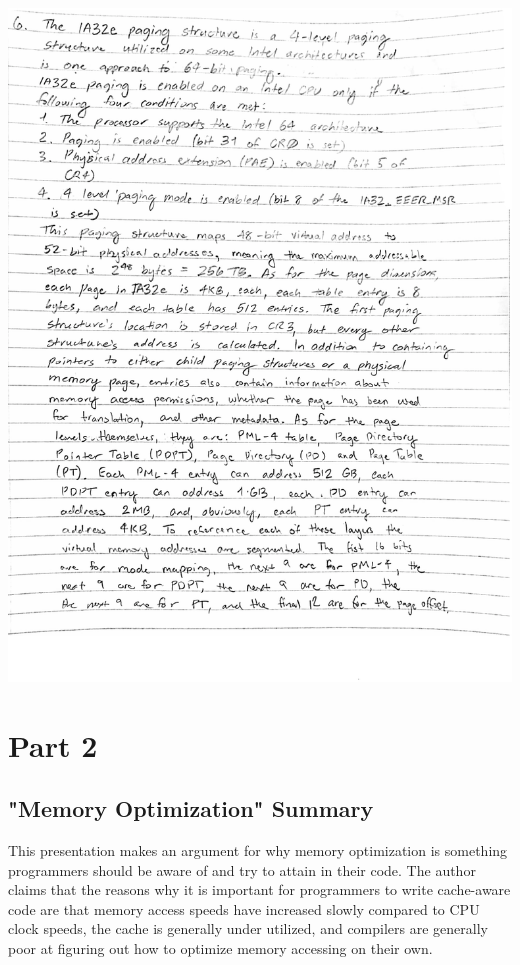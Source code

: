\documentclass[12pt]{article}
\begin{document}
\includegraphics[width=\textwidth]{part12.eps}
\clearpage
\section*{Part 2}
\subsection*{"Memory Optimization" Summary}
This presentation makes an argument for why memory optimization is something programmers should be aware of and try to attain in their code. The author claims that the reasons why it is important for programmers to write cache-aware code are that memory access speeds have increased slowly compared to CPU clock speeds, the cache is generally under utilized, and compilers are generally poor at figuring out how to optimize memory accessing on their own.
\end{document}

